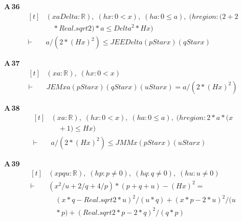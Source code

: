 \noindent\textbf{A\,36}\quad{}
{\footnotesize\[ \begin{aligned}[t]
&(\mathit{x} \mathit{a} \mathit{Delta} : \mathbb{R} ),\; (\mathit{hx} : 0<\mathit{x}),\; (\mathit{ha} : 0\leq \mathit{a}),\; (\mathit{hregion} : (2+2\\
&\quad *\mathit{Real}.\mathit{sqrt} 2)*\mathit{a} \leq \mathit{Delta}^{2}*\mathit{H} \mathit{x})\\
\vdash\;&\mathit{a}/(2*(\mathit{H} \mathit{x})^{2}) \leq \mathit{JEE} \mathit{Delta} (\mathit{pStar} \mathit{x}) (\mathit{qStar} \mathit{x})
\end{aligned} \]}

\noindent\textbf{A\,37}\quad{}
{\footnotesize\[ \begin{aligned}[t]
&(\mathit{x} \mathit{a} : \mathbb{R} ),\; (\mathit{hx} : 0<\mathit{x})\\
\vdash\;&\mathit{JEM} \mathit{x} \mathit{a} (\mathit{pStar} \mathit{x}) (\mathit{qStar} \mathit{x}) (\mathit{uStar} \mathit{x})=\mathit{a}/(2*(\mathit{H} \mathit{x})^{2})
\end{aligned} \]}

\noindent\textbf{A\,38}\quad{}
{\footnotesize\[ \begin{aligned}[t]
&(\mathit{x} \mathit{a} : \mathbb{R} ),\; (\mathit{hx} : 0<\mathit{x}),\; (\mathit{ha} : 0\leq \mathit{a}),\; (\mathit{hregion} : 2*\mathit{a}*(\mathit{x}\\
&\quad +1) \leq \mathit{H} \mathit{x})\\
\vdash\;&\mathit{a}/(2*(\mathit{H} \mathit{x})^{2}) \leq \mathit{JMM} \mathit{x} (\mathit{pStar} \mathit{x}) (\mathit{uStar} \mathit{x})
\end{aligned} \]}

\noindent\textbf{A\,39}\quad{}
{\footnotesize\[ \begin{aligned}[t]
&(\mathit{x} \mathit{p} \mathit{q} \mathit{u} : \mathbb{R} ),\; (\mathit{hp} : \mathit{p}\neq 0),\; (\mathit{hq} : \mathit{q}\neq 0),\; (\mathit{hu} : \mathit{u}\neq 0)\\
\vdash\;&(\mathit{x}^{2}/\mathit{u}+2/\mathit{q}+4/\mathit{p})*(\mathit{p}+\mathit{q}+\mathit{u})-(\mathit{H} \mathit{x})^{2} =\\
&\quad (\mathit{x}*\mathit{q}-\mathit{Real}.\mathit{sqrt} 2*\mathit{u})^{2}/(\mathit{u}*\mathit{q}) + (\mathit{x}*\mathit{p}-2*\mathit{u})^{2}/(\mathit{u}\\
&\quad *\mathit{p}) + (\mathit{Real}.\mathit{sqrt} 2*\mathit{p}-2*\mathit{q})^{2}/(\mathit{q}*\mathit{p})
\end{aligned} \]}

